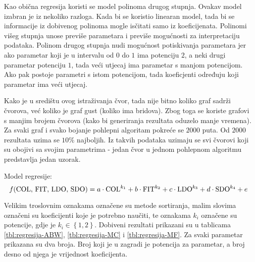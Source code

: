 \documentclass[times, utf8, diplomski, numeric]{fer}
\begin{document}
Kao obična regresija koristi se model polinoma drugog stupnja. Ovakav model izabran je iz nekoliko razloga. Kada bi se koristio linearan model, tada bi se informacije iz dobivenog polinoma mogle isčitati samo iz koeficijenata. Polinomi višeg stupnja unose previše parametara i previše mogućnosti za interpretaciju podataka. Polinom drugog stupnja nudi mogućnost potiskivanja parametara jer ako parametar koji je u intervalu od $0$ do $1$ ima potenciju $2$, a neki drugi parametar potenciju $1$, tada veći utjecaj ima parametar s manjom potencijom. Ako pak postoje parametri s istom potencijom, tada koeficjenti određuju koji parametar ima veći utjecaj.

Kako je u središtu ovog istraživanja čvor, tada nije bitno koliko graf sadrži čvorova, već koliko je graf gust (koliko ima bridova). Zbog toga se koriste grafovi s manjim brojem čvorova (kako bi generiranja rezultata oduzelo manje vremena). Za svaki graf i svako bojanje pohlepni algoritam pokreće se $2000$ puta. Od $2000$ rezultata uzima se $10\%$ najboljih. Iz takvih podataka uzimaju se svi čvorovi koji su obojivi sa svojim parametrima - jedan čvor u jednom pohlepnom algoritmu predstavlja jedan uzorak.

Model regresije:
\begin{equation}
	f(\textup{COL, FIT, LDO, SDO}) = a\cdot \textup{COL}^{k_1} + b\cdot \textup{FIT}^{k_2} + c\cdot \textup{LDO}^{k_3} + d\cdot \textup{SDO}^{k_4} + e
\end{equation}

Velikim troslovnim oznakama označene su metode sortiranja, malim slovima označeni su koeficijenti koje je potrebno naučiti, te oznakama $k_i$ označene su potencije, gdje je $k_i \in \left \{ 1, 2 \right \} $.
Dobiveni rezultati prikazani su u tablicama \ref{tbl:regresija-ABW}, \ref{tbl:regresija-MC} i \ref{tbl:regresija-MF}. Za svaki parametar prikazana su dva broja. Broj koji je u zagradi je potencija za parametar, a broj desno od njega je vrijednost koeficijenta.
\end{document}
